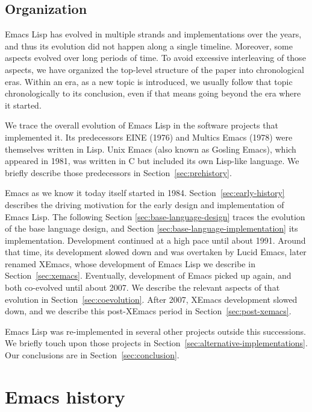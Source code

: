 \documentclass[format=acmsmall, review]{acmart}
\newcommand \Elisp {Emacs Lisp}
\begin{document}
\subsection{Organization}

\Elisp{} has evolved in multiple strands and implementations over the
years, and thus its evolution did not happen along a single timeline.
Moreover, some aspects evolved over long periods of time.  To avoid
excessive interleaving of those aspects, we have organized the
top-level structure of the paper into chronological eras.  Within an
era, as a new topic is introduced, we usually follow that topic
chronologically to its conclusion, even if that means going beyond the
era where it started.

We trace the overall evolution of \Elisp{} in the software projects that
implemented it.  Its predecessors EINE (1976) and Multics Emacs (1978) were
themselves written in Lisp.  Unix Emacs (also known as Gosling Emacs), which
appeared in 1981, was written in C but included its own Lisp-like language.
We briefly describe those predecessors in Section~\ref{sec:prehistory}.

Emacs as we know it today itself started in 1984.
Section~\ref{sec:early-history} describes the driving motivation for
the early design and implementation of \Elisp.  The following Section
\ref{sec:base-language-design} traces the evolution of the base
language design, and Section \ref{sec:base-language-implementation}
its implementation.
Development continued at a high pace until about 1991.
Around that time, its development slowed down and
was overtaken by Lucid Emacs, later renamed XEmacs, whose development of
\Elisp{} we describe in Section~\ref{sec:xemacs}.  Eventually,
development of Emacs picked up again, and both co-evolved until about
2007.  We describe the relevant aspects of that evolution in
Section~\ref{sec:coevolution}.  After 2007, XEmacs development slowed
down, and we describe this post-XEmacs period in
Section~\ref{sec:post-xemacs}.

\Elisp{} was re-implemented in several other projects outside this
successions.  We briefly touch upon those projects in
Section~\ref{sec:alternative-implementations}.  Our conclusions are in
Section~\ref{sec:conclusion}.

\section{Emacs history}
\label{sec:emacs-history}

\end{document}
